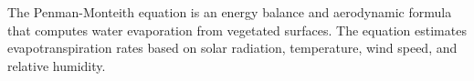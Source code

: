The Penman-Monteith equation is an energy balance and aerodynamic formula that computes water evaporation from vegetated surfaces.  The equation estimates evapotranspiration rates based on solar radiation, temperature, wind speed, and relative humidity.


